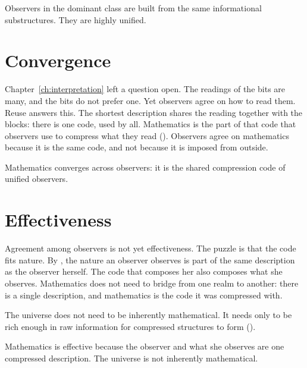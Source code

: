 \documentclass[11pt]{book}
\begin{document}
\begin{deduction}\label{ded:shared}
  Observers in the dominant class are built from the same informational
  substructures. They are highly unified.
\end{deduction}


\section{Convergence}
\label{sec:convergence}

Chapter~\ref{ch:interpretation} left a question open. The readings of the
bits are many, and the bits do not prefer one. Yet observers agree on how
to read them. Reuse answers this. The shortest description shares the
reading together with the blocks: there is one code, used by all. Mathematics
is the part of that code that observers use to compress what they read
(). Observers agree on mathematics because it is the
same code, and not because it is imposed from outside.

\begin{deduction}[Convergence]\label{ded:convergence}
  Mathematics converges across observers: it is the shared compression
  code of unified observers.
\end{deduction}


\section{Effectiveness}
\label{sec:effectiveness}

Agreement among observers is not yet effectiveness. The puzzle is that the
code fits nature. By , the nature an observer observes is
part of the same description as the observer herself. The code that
composes her also composes what she observes. Mathematics does not need to
bridge from one realm to another: there is a single description, and
mathematics is the code it was compressed with.

The universe does not need to be inherently mathematical. It needs only to
be rich enough in raw information for compressed structures to form
().

\begin{deduction}[Effectiveness]\label{ded:effectiveness}
  Mathematics is effective because the observer and what she observes are
  one compressed description. The universe is not inherently mathematical.
\end{deduction}
\end{document}
